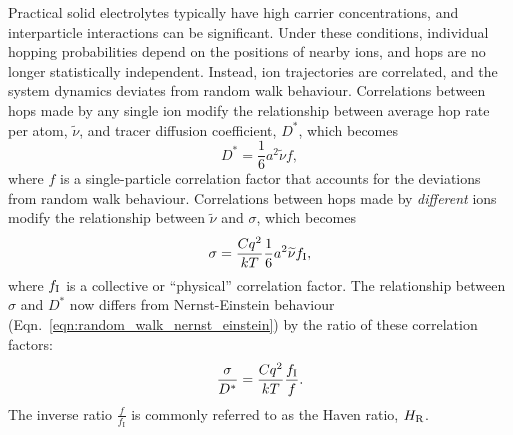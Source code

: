 \documentclass[aps,prb,twocolumn,superscriptaddress,reprint]{revtex4-1}
\newcommand{\hrpa}{{\widetilde{\nu}}}
\begin{document}
Practical solid electrolytes typically have high carrier concentrations, and interparticle interactions can be significant. 
Under these conditions, individual hopping probabilities depend on the positions of nearby ions, and hops are no longer statistically independent. 
Instead, ion trajectories are correlated, and the system dynamics deviates from random walk behaviour.\cite{BardeenAndHerring_Imperfections1952, CompaanAndHaven_TransFaradaySoc1958, AllnattAndLidiard_AtomicTransportInSolids,HowardAndLidiard_RepProgPhys1964} Correlations between hops made by any single ion modify the relationship between average hop rate per atom, $\hrpa$, and tracer diffusion coefficient, $D^*$, which becomes
\begin{equation}
  D^* = \frac{1}{6}a^2\hrpa f,
  \label{eqn:correlated_diffusion}
\end{equation}
where $f$ is a single-particle correlation factor that accounts for the deviations from random walk behaviour. 
Correlations between hops made by \emph{different} ions modify the relationship between $\hrpa$ and $\sigma$, which becomes
\begin{equation}
  \sigma = \frac{Cq^2}{kT}\frac{1}{6}a^2\hrpa f_\m{I},
  \label{eqn:correlated_conductivity}
\end{equation}
where $f_{\mathrm{I}}$ is a collective or ``physical'' correlation factor.\cite{Mehrer_DiffusionBook, Murch_SolStatIonics1982,SatoAndKikuchi_JChemPhys1971} 
The relationship between $\sigma$ and $D^*$ now differs from Nernst-Einstein behaviour (Eqn.~\ref{eqn:random_walk_nernst_einstein}) by the ratio of these correlation factors:
\begin{equation}
  \frac{\sigma}{D^*} = \frac{Cq^2}{kT}\frac{f_{\mathrm{I}}}{f}.
  \label{eqn:correlated_nernst_einstein}
\end{equation}
The inverse ratio $\frac{f}{f_\mathrm{I}}$ is commonly referred to as the Haven ratio, $H_{\mathrm{R}}$\cite{Murch_SolStatIonics1982,Akbar_JApplPhys1994}.
\end{document}
